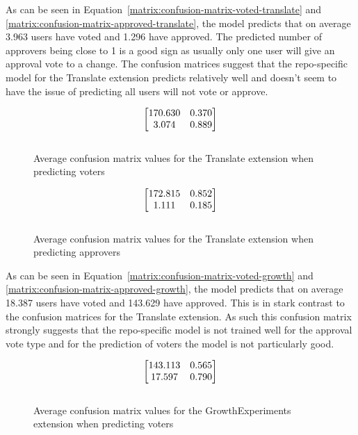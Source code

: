 As can be seen in Equation~\ref{matrix:confusion-matrix-voted-translate} and \ref{matrix:confusion-matrix-approved-translate}, the model predicts that on average 3.963 users have voted and 1.296 have approved. The predicted number of approvers being close to 1 is a good sign as usually only one user will give an approval vote to a change. The confusion matrices suggest that the repo-specific model for the Translate extension predicts relatively well and doesn't seem to have the issue of predicting all users will not vote or approve.

\begin{figure}[H]
\begin{equation}
\begin{bmatrix}
$170.630$ & $0.370$ \\
$3.074$ & $0.889$
\end{bmatrix}
\label{matrix:confusion-matrix-voted-translate}
\end{equation}
\\{Average confusion matrix values for the Translate extension when predicting voters}
\end{figure}
\hspace{0.25cm}

\begin{figure}[H]
\begin{equation}
\begin{bmatrix}
$172.815$ & $0.852$ \\
$1.111$ & $0.185$
\end{bmatrix}
\label{matrix:confusion-matrix-approved-translate}
\end{equation}
\\{Average confusion matrix values for the Translate extension when predicting approvers}
\end{figure}
\hspace{0.25cm}

As can be seen in Equation~\ref{matrix:confusion-matrix-voted-growth} and \ref{matrix:confusion-matrix-approved-growth}, the model predicts that on average 18.387 users have voted and 143.629 have approved. This is in stark contrast to the confusion matrices for the Translate extension. As such this confusion matrix strongly suggests that the repo-specific model is not trained well for the approval vote type and for the prediction of voters the model is not particularly good.

\begin{figure}[H]
\begin{equation}
\begin{bmatrix}
$143.113$ & $0.565$ \\
$17.597$ & $0.790$
\end{bmatrix}
\label{matrix:confusion-matrix-voted-growth}
\end{equation}
\\{Average confusion matrix values for the GrowthExperiments extension when predicting voters}
\end{figure}
\hspace{0.25cm}

